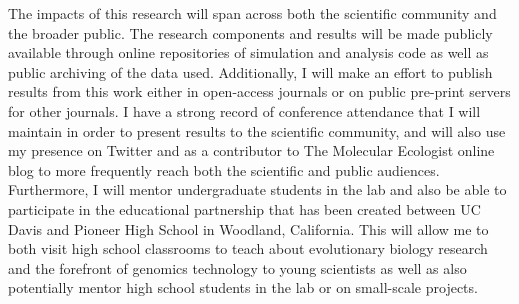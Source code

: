 The impacts of this research will span across both the scientific community and the broader public. The research components and results will be made publicly available  through online repositories of simulation and analysis code as well as public archiving of the data used. Additionally, I will make an effort to publish results from this work either in open-access journals %
or on public pre-print servers for other journals. I have a strong record of conference attendance that I will maintain in order to present results to the scientific community, and will also use my presence on Twitter and as a contributor to The Molecular Ecologist online blog to more frequently reach both the scientific and public audiences. Furthermore, I will mentor undergraduate students in the lab and also be able to participate in the educational partnership that has been created between UC Davis and Pioneer High School in Woodland, California. This will allow me to both visit high school classrooms to teach about evolutionary biology research and the forefront of genomics technology to young scientists as well as also potentially mentor high school students in the lab or on small-scale projects. %

